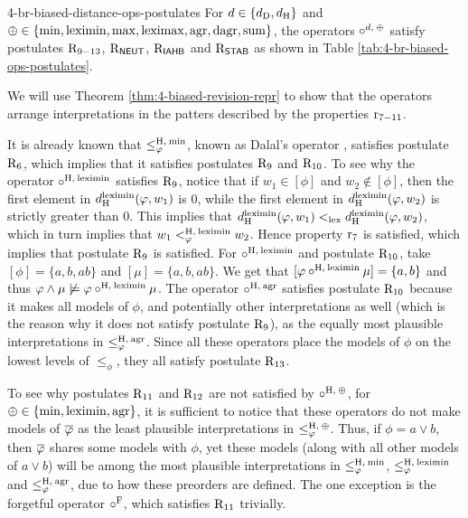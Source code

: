 \begin{prp}{}{4-br-biased-distance-ops-postulates}
	For $d\in\{d_{\operatorname{D}},d_{\operatorname{H}}\}$ 
	and ${\operatorname{\oplus}}\in\{{\operatorname{min}}, {\operatorname{leximin}}, {\operatorname{max}}, {\operatorname{leximax}},\mathrm{agr}, \mathrm{dagr}, {\operatorname{sum}}\}$,
	the operators $\circ^{d,\:{\operatorname{\oplus}}}$ satisfy
	postulates $\mathrm{R}_{9-13}$, $\mathrm{R}_{\mathsf{NEUT}}$, $\mathrm{R}_{\mathsf{IAHB}}$ and $\mathrm{R}_{\mathsf{STAB}}$ 
	as shown in Table \ref{tab:4-br-biased-ops-postulates}.
\end{prp}
\begin{prf*}{}{}%
	We will use Theorem \ref{thm:4-biased-revision-repr} to show that the operators
	arrange interpretations in the patters described by the properties $\mathrm{r}_{7-11}$.

	It is already known that $\le_\varphi^{{\operatorname{H}},\:{\operatorname{min}}}$, known as Dalal's operator \cite{Dalal88},
	satisfies postulate $\mathrm{R}_{6}$, which implies that it satisfies postulates $\mathrm{R}_{9}$ and $\mathrm{R}_{10}$. 
	To see why the operator $\circ^{{\operatorname{H}},\:{\operatorname{leximin}}}$ satisfies $\mathrm{R}_{9}$,
	notice that if $w_1\in[\phi]$ and $w_2\notin[\phi]$, 
	then the first element in $d^{\operatorname{leximin}}_{\operatorname{H}}(\varphi,w_1)$ is $0$,
	while the first element in $d^{\operatorname{leximin}}_{\operatorname{H}}(\varphi,w_2)$ is 
	strictly greater than $0$.
	This implies that 
	$d^{\operatorname{leximin}}_{\operatorname{H}}(\varphi,w_1)<_{\operatorname{lex}}d^{\operatorname{leximin}}_{\operatorname{H}}(\varphi,w_2)$,
	which in turn implies that $w_1<_\varphi^{{\operatorname{H}},\:{\operatorname{leximin}}}w_2$.   
	Hence property $\mathrm{r}_{7}$ is satisfied,
	which implies that postulate $\mathrm{R}_{9}$ is satisfied.	
	For $\circ^{{\operatorname{H}},\:{\operatorname{leximin}}}$ and postulate $\mathrm{R}_{10}$, take
	$[\phi]=\{a,b,ab\}$ and $[\mu]=\{a,b,ab\}$.
	We get that $[\varphi \circ^{{\operatorname{H}},\:{\operatorname{leximin}}}\mu]=\{a,b\}$
	and thus 
	$\varphi\land\mu\not\models\varphi \circ^{{\operatorname{H}},\:{\operatorname{leximin}}}\mu$.
	The operator $\circ^{{\operatorname{H}},\:\mathrm{agr}}$ satisfies postulate $\mathrm{R}_{10}$ because
	it makes all models of $\phi$, and potentially other interpretations as well
	(which is the reason why it does not satisfy postulate $\mathrm{R}_{9}$),
	as the equally most plausible interpretations in $\le_\varphi^{{\operatorname{H}},\:\mathrm{agr}}$. 
	Since all these operators place the models of $\phi$ on the lowest levels of 
	$\le_\phi$, they all satisfy postulate $\mathrm{R}_{13}$.
	
	To see why postulates $\mathrm{R}_{11}$ and $\mathrm{R}_{12}$ are not satisfied by
	$\circ^{{\operatorname{H}},\:{\operatorname{\oplus}}}$,
	for ${\operatorname{\oplus}}\in\{{\operatorname{min}},{\operatorname{leximin}},\mathrm{agr}\}$,
	it is sufficient to 
	notice that these operators do not make models of $\overline{\varphi}$ as the least plausible interpretations
	in $\le_\varphi^{{\operatorname{H}},\:{\operatorname{\oplus}}}$. Thus, if $\phi=a\lor b$, then $\overline{\varphi}$ shares some models
	with $\phi$, yet these models (along with all other models of $a\lor b$)
	will be among the most plausible interpretations
	in $\le_\varphi^{{\operatorname{H}},\:{\operatorname{min}}}$, $\le_\varphi^{{\operatorname{H}},\:{\operatorname{leximin}}}$ and $\le_\varphi^{{\operatorname{H}},\:\mathrm{agr}}$,
	due to how these preorders are defined.
	The one exception is the forgetful operator $\circ^{\mathrm{F}}$, 
	which satisfies $\mathrm{R}_{11}$ trivially.
	

\end{prf*}
